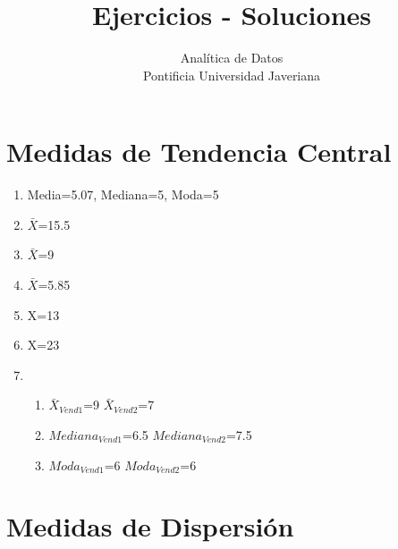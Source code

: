 \documentclass[letterpaper]{article}
\date{\vspace{-5ex}}
\begin{document}
\title{{\bf Ejercicios - Soluciones}} 
\author{Analítica de Datos  \\
	Pontificia Universidad Javeriana}


\maketitle


\section{Medidas de Tendencia Central}
\begin{enumerate}
\item Media=5.07, Mediana=5, Moda=5
\item $\bar{X}$=15.5
\item $\bar{X}$=9
\item $\bar{X}$=5.85
\item X=13
\item X=23
\item 

\begin{enumerate}
	\item $\bar{X}_{Vend1}$=9 $\bar{X}_{Vend2}$=7
	\item $Mediana_{Vend1}$=6.5 $Mediana_{Vend2}$=7.5
	\item $Moda_{Vend1}$=6 $Moda_{Vend2}$=6
\end{enumerate}
	
\end{enumerate}

\section{Medidas de Dispersión}
\end{document}
